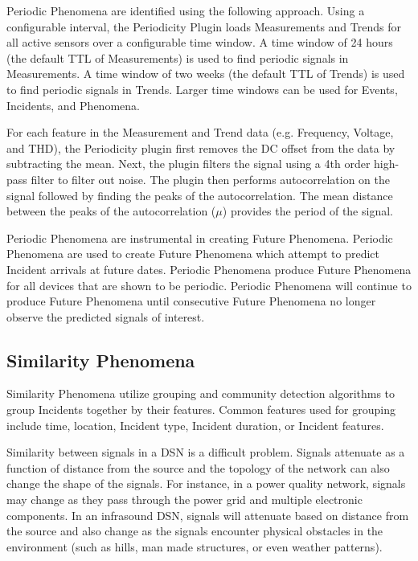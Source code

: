 Periodic Phenomena are identified using the following approach. Using a configurable interval, the Periodicity Plugin loads Measurements and Trends for all active sensors over a configurable time window. A time window of 24 hours (the default TTL of Measurements) is used to find periodic signals in Measurements. A time window of two weeks (the default TTL of Trends) is used to find periodic signals in Trends. Larger time windows can be used for Events, Incidents, and Phenomena.

For each feature in the Measurement and Trend data (e.g. Frequency, Voltage, and THD), the Periodicity plugin first removes the DC offset from the data by subtracting the mean. Next, the plugin filters the signal using a 4th order high-pass filter to filter out noise. The plugin then performs autocorrelation on the signal followed by finding the peaks of the autocorrelation. The mean distance between the peaks of the autocorrelation ($\mu$) provides the period of the signal.

Periodic Phenomena are instrumental in creating Future Phenomena. Periodic Phenomena are used to create Future Phenomena which attempt to predict Incident arrivals at future dates. Periodic Phenomena produce Future Phenomena for all devices that are shown to be periodic. Periodic Phenomena will continue to produce Future Phenomena until consecutive Future Phenomena no longer observe the predicted signals of interest.

\subsection{Similarity Phenomena}\label{subsec:similarity-phenomena}
Similarity Phenomena utilize grouping and community detection algorithms to group Incidents together by their features. Common features used for grouping include time, location, Incident type, Incident duration, or Incident features.

Similarity between signals in a DSN is a difficult problem. Signals attenuate as a function of distance from the source and the topology of the network can also change the shape of the signals. For instance, in a power quality network, signals may change as they pass through the power grid and multiple electronic components. In an infrasound DSN, signals will attenuate based on distance from the source and also change as the signals encounter physical obstacles in the environment (such as hills, man made structures, or even weather patterns).

